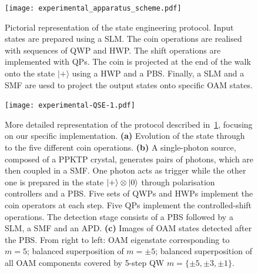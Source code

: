 
\begin{figure}[tb]
\centering
\texttt{[image: experimental\_apparatus\_scheme.pdf]}
\caption{
    Pictorial representation of the state engineering protocol.
    Input states are prepared using a \ac{SLM}.
    The coin operations are realised with sequences of \ac{QWP} and \ac{HWP}.
    The shift operations are implemented with \acp{QP}.
    The coin is projected at the end of the walk onto the state $\vert + \rangle$ using a \ac{HWP} and a \ac{PBS}.
    Finally, a \ac{SLM} and a \ac{SMF} are uesd to project the output states onto specific \ac{OAM} states.
}
\label{fig:expQWs:proposal_exp}
\end{figure}

\begin{figure}[tb]
\texttt{[image: experimental-QSE-1.pdf]}
\caption{
	More detailed representation of the protocol described in~\cref{fig:expQWs:proposal_exp}, focusing on our specific implementation.
	\textbf{(a)} Evolution of the state through to the five different coin operations.
	\textbf{(b)} A single-photon source, composed of a \ac{PPKTP} crystal, generates pairs of photons, which are then coupled in a SMF. One photon acts as trigger while the other one is prepared in the state $\ket{+}\otimes \ket{0}$ through polarisation controllers and a \ac{PBS}. Five sets of \acp{QWP} and \acp{HWP} implement the coin operators at each step. Five \acp{QP} implement the controlled-shift operations.
	The detection stage consists of a \ac{PBS} followed by a \ac{SLM}, a \ac{SMF} and an \ac{APD}.
	\textbf{(c)} Images of \ac{OAM} states detected after the \ac{PBS}. From right to left: \ac{OAM} eigenstate corresponding to $m=5$; balanced superposition of $m=\pm 5$; balanced superposition of all \ac{OAM} components covered by 5-step \ac{QW} $m=\{\pm 5, \pm 3, \pm 1\}$.
}
\label{fig:expQWs:schematics}
\end{figure}

